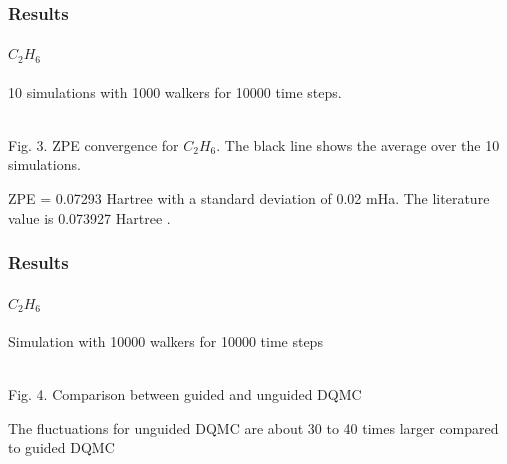 \documentclass[16pt]{beamer}
\begin{document}
\begin{frame}
\frametitle{Results}
\framesubtitle{$C_2 H_6$}
10 simulations with 1000 walkers for 10000 time steps.
\begin{center}
\\
Fig. 3. ZPE convergence for $C_2 H_6$. The black line shows the average over the 10 simulations.
\end{center}
ZPE = 0.07293 Hartree with a standard deviation of 0.02 mHa. The literature value is 0.073927 Hartree \cite{c2h6}.\\

\end{frame}

\begin{frame}
\frametitle{Results}
\framesubtitle{$C_2 H_6$}
Simulation with 10000 walkers for 10000 time steps
\begin{center}
\\
Fig. 4. Comparison between guided and unguided DQMC
\end{center}
The fluctuations for unguided DQMC are about 30 to 40 times larger compared to guided DQMC
\end{frame}
\end{document}
